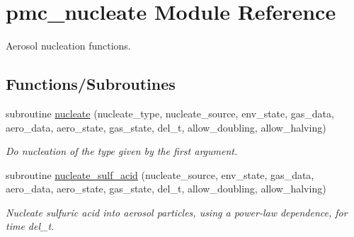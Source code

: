 \hypertarget{namespacepmc__nucleate}{}\section{pmc\+\_\+nucleate Module Reference}
\label{namespacepmc__nucleate}


Aerosol nucleation functions.  


\subsection*{Functions/\+Subroutines}
\begin{DoxyCompactItemize}
\item 
subroutine \mbox{\hyperlink{namespacepmc__nucleate_ab7689a91cea62cc200e2356b2c201416}{nucleate}} (nucleate\+\_\+type, nucleate\+\_\+source, env\+\_\+state, gas\+\_\+data, aero\+\_\+data, aero\+\_\+state, gas\+\_\+state, del\+\_\+t, allow\+\_\+doubling, allow\+\_\+halving)
\begin{DoxyCompactList}\small\item\em Do nucleation of the type given by the first argument. \end{DoxyCompactList}\item 
subroutine \mbox{\hyperlink{namespacepmc__nucleate_a417a8f6c4fbc4f588ac915a173b2fda2}{nucleate\+\_\+sulf\+\_\+acid}} (nucleate\+\_\+source, env\+\_\+state, gas\+\_\+data, aero\+\_\+data, aero\+\_\+state, gas\+\_\+state, del\+\_\+t, allow\+\_\+doubling, allow\+\_\+halving)
\begin{DoxyCompactList}\small\item\em Nucleate sulfuric acid into aerosol particles, using a power-\/law dependence, for time {\ttfamily del\+\_\+t}. \end{DoxyCompactList}\end{DoxyCompactItemize}
